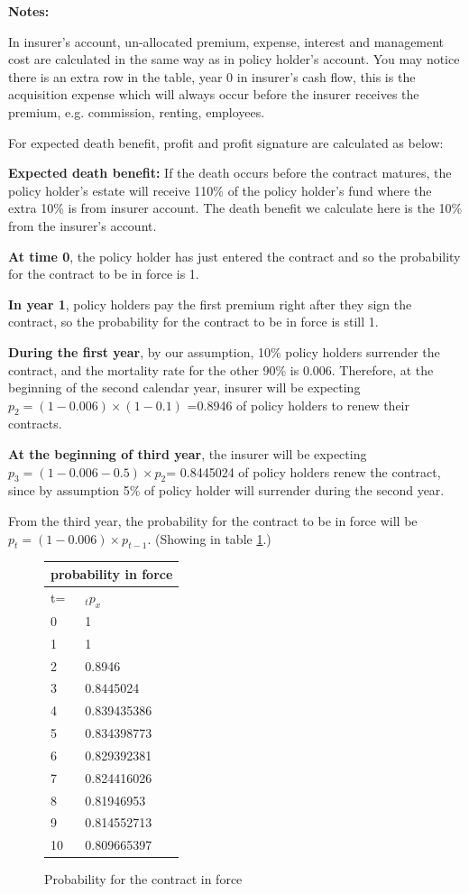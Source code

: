 \documentclass{report}
\begin{document}
\textbf{Notes:}

In insurer's account, un-allocated premium, expense, interest and management cost are calculated in the same way as in policy holder's account. You may notice there is an extra row in the table, year 0 in insurer's cash flow, this is the acquisition expense which will always occur before the insurer receives the premium, e.g. commission, renting, employees.

For expected death benefit, profit and profit signature are calculated as below:

\textbf{Expected death benefit:} If the death occurs before the contract matures, the policy holder's estate will receive 110\% of the policy holder's fund where the extra 10\% is from insurer account. The death benefit we calculate here is the 10\% from the insurer's account. 

\textbf{At time 0}, the policy holder has just entered the contract and so the probability for the contract to be in force is 1.

\textbf{In year 1}, policy holders pay the first premium right after they sign the contract, so the probability for the contract to be in force is still 1. 

\textbf{During the first year}, by our assumption, 10\% policy holders surrender the contract, and the mortality rate for the other 90\% is 0.006. Therefore, at the beginning of the second calendar year, insurer will be expecting $p_2= (1-0.006) \times(1-0.1)$ =0.8946 of policy holders to renew their contracts. 

\textbf{At the beginning of third year}, the insurer will be expecting $p_3= (1-0.006-0.5) \times p_2$= 0.8445024 of policy holders renew the contract, since by assumption 5\% of policy holder will surrender during the second year.

From the third year, the probability for the contract to be in force will be $p_t = (1-0.006) \times p_{t-1}$. (Showing in table \ref{determ-prob-in-force}.)


\begin{figure}[H]
    \centering
\begin{tabular}{|l|l|}
  \hline
  \multicolumn{2}{|c|}{probability in force} \\
  \hline
t=	& $_t p_x$\\
\hline
0	&1\\
1	&1\\
2	&0.8946\\
3	&0.8445024\\
4	&0.839435386\\
5	&0.834398773\\
6	&0.829392381\\
7	&0.824416026\\
8	&0.81946953\\
9	&0.814552713\\
10	&0.809665397\\
  \hline
\end{tabular}
\caption{Probability for the contract in force}
\label{determ-prob-in-force}
\end{figure}
\end{document}

